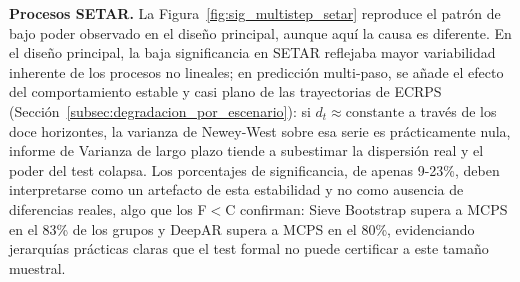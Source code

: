 \textbf{Procesos SETAR.} La Figura~\ref{fig:sig_multistep_setar} reproduce el patrón de bajo poder observado en el diseño principal, aunque aquí la causa es diferente. En el diseño principal, la baja significancia en SETAR reflejaba mayor variabilidad inherente de los procesos no lineales; en predicción multi-paso, se añade el efecto del comportamiento estable y casi plano de las trayectorias de ECRPS (Sección~\ref{subsec:degradacion_por_escenario}): si $d_t \approx \text{constante}$ a través de los doce horizontes, la varianza de Newey-West sobre esa serie es prácticamente nula, informe de Varianza de largo plazo tiende a subestimar la dispersión real y el poder del test colapsa. Los porcentajes de significancia, de apenas 9-23\%, deben interpretarse como un artefacto de esta estabilidad y no como ausencia de diferencias reales, algo que los F$<$C confirman: Sieve Bootstrap supera a MCPS en el 83\% de los grupos y DeepAR supera a MCPS en el 80\%, evidenciando jerarquías prácticas claras que el test formal no puede certificar a este tamaño muestral.
